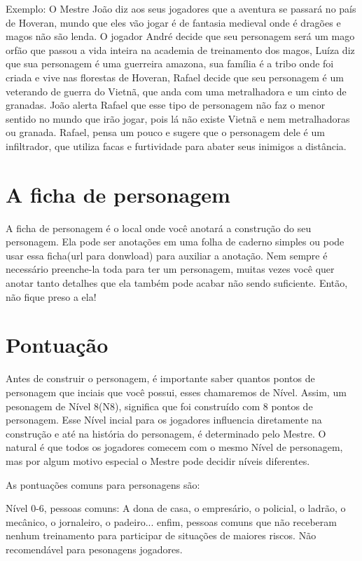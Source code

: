 Exemplo: O Mestre João diz aos seus jogadores que a aventura se passará no país de Hoveran, mundo que eles vão jogar é de fantasia medieval onde é dragões e magos não são lenda. O jogador André decide que seu personagem será um mago orfão que passou a vida inteira na academia de treinamento dos magos, Luíza diz que sua personagem é uma guerreira amazona, sua família é a tribo onde foi criada e vive nas florestas de Hoveran, Rafael decide que seu personagem é um veterando de guerra do Vietnã, que anda com uma metralhadora e um cinto de granadas. João alerta Rafael que esse tipo de personagem não faz o menor sentido no mundo que irão jogar, pois lá não existe Vietnã e nem metralhadoras ou granada. Rafael, pensa um pouco e sugere que o personagem dele é um infiltrador, que utiliza facas e furtividade para abater seus inimigos a distância.

\section{A ficha de personagem}

A ficha de personagem é o local onde você anotará a construção do seu personagem. Ela pode ser anotações em uma folha de caderno simples ou pode usar essa ficha(url para donwload) para auxiliar a anotação. Nem sempre é necessário preenche-la toda para ter um personagem, muitas vezes você quer anotar tanto detalhes que ela também pode acabar não sendo suficiente. Então, não fique preso a ela!

\section{Pontuação}
Antes de construir o personagem, é importante saber quantos pontos de personagem que inciais que você possui, esses chamaremos de Nível. Assim, um pesonagem de Nível 8(N8), significa que foi construído com 8 pontos de personagem. Esse Nível incial para os jogadores influencia diretamente na construção e até na história do personagem, é determinado pelo Mestre. O natural é que todos os jogadores comecem com o mesmo Nível de personagem, mas por algum motivo especial o Mestre pode decidir níveis diferentes.

As pontuações comuns para personagens são:

Nível 0-6, pessoas comuns: A dona de casa, o empresário, o policial, o ladrão, o mecânico, o jornaleiro, o padeiro... enfim, pessoas comuns que não receberam nenhum treinamento para participar de situações de maiores riscos. Não recomendável para pesonagens jogadores.

